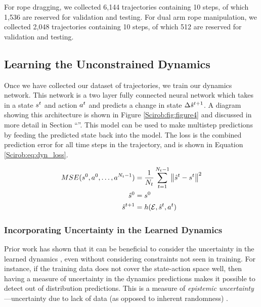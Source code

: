 For rope dragging, we collected 6,144 trajectories containing 10 steps, of which 1,536 are reserved for validation and testing. For dual arm rope manipulation, we collected 2,048 trajectories containing 10 steps, of which 512 are reserved for validation and testing.
\subsection{Learning the Unconstrained Dynamics}
\label{Scirob:sec:learning_dynamics}

Once we have collected our dataset of trajectories, we train our dynamics network. This network is a two layer fully connected neural network which takes in a state $s^{t}$ and action $a^{t}$ and predicts a change in state $\Delta \hat{s}^{t+1}$. A diagram showing this architecture is shown in Figure \ref{Scirob:fig:figure4} and discussed in more detail in Section ``''. This model can be used to make multistep predictions by feeding the predicted state back into the model. The loss is the combined prediction error for all time steps in the trajectory, and is shown in Equation \eqref{Scirob:eq:dyn_loss}.

\begin{equation}
	\begin{split}
	MSE(s^0, a^0, \dots, a^{N_{t}-1}) &= \frac{1}{N_{t}} \sum_{t=1}^{N_{t}-1} \left\| \hat{s}^{t} - s^{t} \right\|^2 \\
	\hat{s}^0 &= s^0 \\
	\hat{s}^{t+1} &= h(\mathcal{E}, \hat{s}^{t}, a^{t})
	\end{split}
	\label{Scirob:eq:dyn_loss}
\end{equation}

\subsubsection{Incorporating Uncertainty in the Learned Dynamics}
\label{Scirob:sec:uncertainty}

Prior work has shown that it can be beneficial to consider the uncertainty in the learned dynamics \cite{Schneider1996,Bechtle2019,Chua2018}, even without considering constraints not seen in training. For instance, if the training data does not cover the state-action space well, then having a measure of uncertainty in the dynamics predictions makes it possible to detect out of distribution predictions. This is a measure of \textit{epistemic uncertainty}---uncertainty due to lack of data (as opposed to inherent randomness) \cite{Hullermeier2021,Hora1996}.

